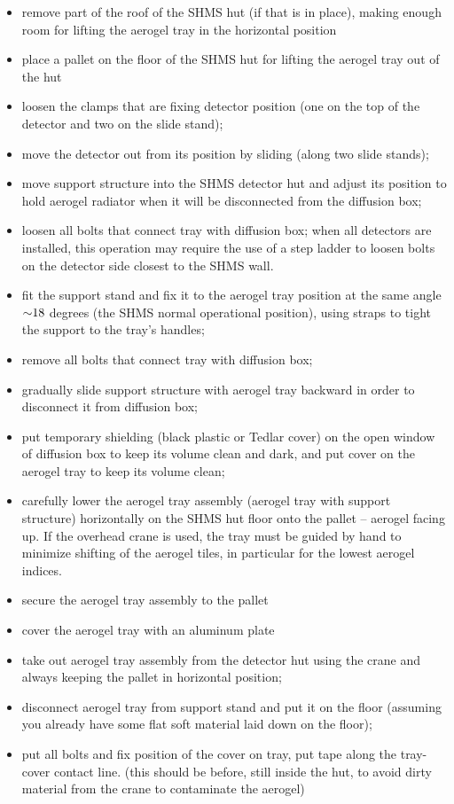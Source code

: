{\begin{itemize}
  \item remove part of the roof of the SHMS hut (if that is in place),
    making enough room for lifting the aerogel tray in the horizontal
    position
  \item place a pallet on the floor of the SHMS hut for lifting the
    aerogel tray out of the hut
  \item loosen the clamps that are fixing detector position (one on
    the top of the detector and two on the slide stand);
  \item move the detector out from its position by sliding (along two
    slide stands);
  \item move support structure into the SHMS detector hut and adjust
    its position to hold aerogel radiator when it will be disconnected
    from the diffusion box;
  \item loosen all bolts that connect tray with diffusion box; when
    all detectors are installed, this operation may require the use of
    a step ladder to loosen bolts on the detector side closest to the
    SHMS wall.
  \item fit the support stand and fix it to the aerogel tray position
    at the same angle $\mathord{\sim} 18$ degrees (the SHMS normal operational
    position), using straps to tight the support to the tray's
    handles;
  \item remove all bolts that connect tray with diffusion box;
  \item gradually slide support structure with aerogel tray backward
    in order to disconnect it from diffusion box;
  \item put temporary shielding (black plastic or Tedlar cover) on the
    open window of diffusion box to keep its volume clean and dark,
    and put cover on the aerogel tray to keep its volume clean;
  \item carefully lower the aerogel tray assembly (aerogel tray with
    support structure) horizontally on the SHMS hut floor onto the
    pallet – aerogel facing up. If the overhead crane is used, the
    tray must be guided by hand to minimize shifting of the aerogel
    tiles, in particular for the lowest aerogel indices.
  \item secure the aerogel tray assembly to the pallet
  \item cover the aerogel tray with an aluminum plate
  \item take out aerogel tray assembly from the detector hut using the
    crane and always keeping the pallet in horizontal position;
  \item disconnect aerogel tray from support stand and put it on the
    floor (assuming you already have some flat soft material laid down
    on the floor);
  \item put all bolts and fix position of the cover on tray, put tape
    along the tray-cover contact line. (this should be before, still
    inside the hut, to avoid dirty material from the crane to
    contaminate the aerogel)
\end{itemize}

}
